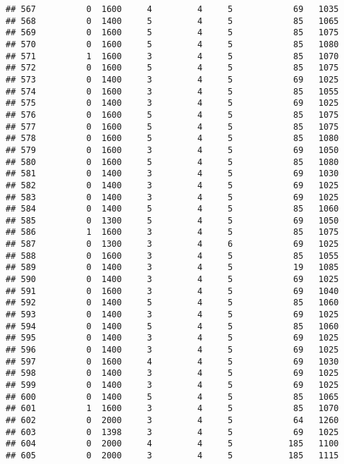 \documentclass[]{article}
\begin{document}
\begin{verbatim}
## 567          0  1600     4         4     5            69   1035
## 568          0  1400     5         4     5            85   1065
## 569          0  1600     5         4     5            85   1075
## 570          0  1600     5         4     5            85   1080
## 571          1  1600     3         4     5            85   1070
## 572          0  1600     5         4     5            85   1075
## 573          0  1400     3         4     5            69   1025
## 574          0  1600     3         4     5            85   1055
## 575          0  1400     3         4     5            69   1025
## 576          0  1600     5         4     5            85   1075
## 577          0  1600     5         4     5            85   1075
## 578          0  1600     5         4     5            85   1080
## 579          0  1600     3         4     5            69   1050
## 580          0  1600     5         4     5            85   1080
## 581          0  1400     3         4     5            69   1030
## 582          0  1400     3         4     5            69   1025
## 583          0  1400     3         4     5            69   1025
## 584          0  1400     5         4     5            85   1060
## 585          0  1300     5         4     5            69   1050
## 586          1  1600     3         4     5            85   1075
## 587          0  1300     3         4     6            69   1025
## 588          0  1600     3         4     5            85   1055
## 589          0  1400     3         4     5            19   1085
## 590          0  1400     3         4     5            69   1025
## 591          0  1600     3         4     5            69   1040
## 592          0  1400     5         4     5            85   1060
## 593          0  1400     3         4     5            69   1025
## 594          0  1400     5         4     5            85   1060
## 595          0  1400     3         4     5            69   1025
## 596          0  1400     3         4     5            69   1025
## 597          0  1600     4         4     5            69   1030
## 598          0  1400     3         4     5            69   1025
## 599          0  1400     3         4     5            69   1025
## 600          0  1400     5         4     5            85   1065
## 601          1  1600     3         4     5            85   1070
## 602          0  2000     3         4     5            64   1260
## 603          0  1398     3         4     5            69   1025
## 604          0  2000     4         4     5           185   1100
## 605          0  2000     3         4     5           185   1115

\end{verbatim}
\end{document}
